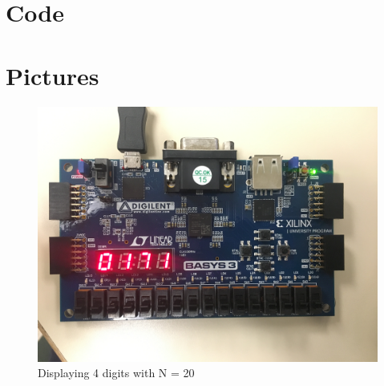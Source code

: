 \documentclass[11pt]{article}
\newcommand{\Verilog}[2][]{%
	
}
\begin{document}
\section*{Code}
\Verilog[firstline=23,caption=Counter Implementation]{../verilog_code/counter.sv}
\Verilog[firstline=23,caption=Counter Test Bench]{../verilog_code/counter_test.sv}
\Verilog[firstline=23,caption=show\_2c Implementation]{../verilog_code/show_2c.sv}
\Verilog[firstline=23,caption=show\_2c Test Bench]{../verilog_code/show_2c_test.sv}
\Verilog[firstline=23,caption=Wrapper Implementation]{../verilog_code/wrapper.sv}
\Verilog[firstline=23,caption=Top-Level Implementation]{../verilog_code/calc_lab10.sv}


\section*{Pictures}
\begin{figure}[ht]
	\centering
	\includegraphics[width=12cm]{"board/4digit"}
	\caption{Displaying 4 digits with N = 20}
\end{figure}
\end{document}
